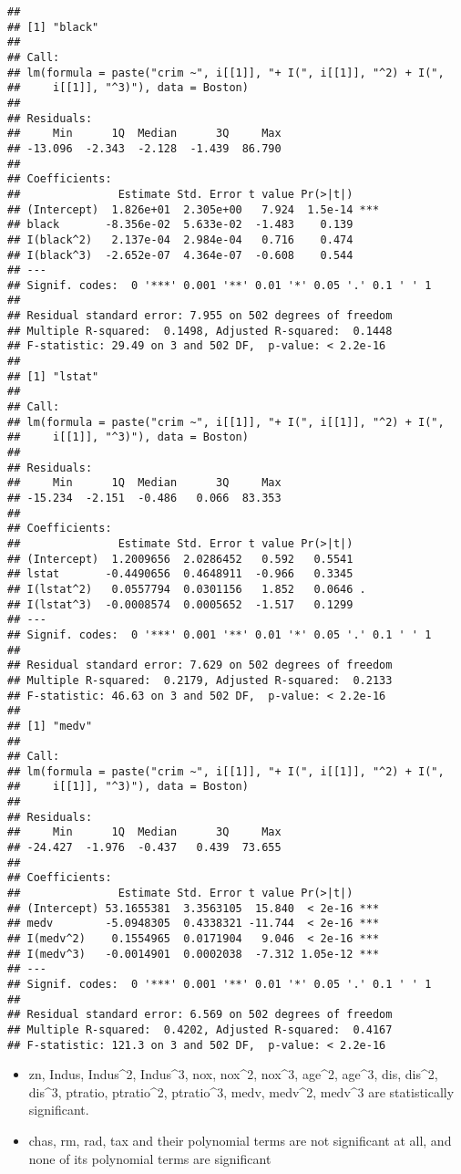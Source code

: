 \documentclass[
]{article}
\begin{document}
\begin{verbatim}
## 
## [1] "black"
## 
## Call:
## lm(formula = paste("crim ~", i[[1]], "+ I(", i[[1]], "^2) + I(", 
##     i[[1]], "^3)"), data = Boston)
## 
## Residuals:
##     Min      1Q  Median      3Q     Max 
## -13.096  -2.343  -2.128  -1.439  86.790 
## 
## Coefficients:
##               Estimate Std. Error t value Pr(>|t|)    
## (Intercept)  1.826e+01  2.305e+00   7.924  1.5e-14 ***
## black       -8.356e-02  5.633e-02  -1.483    0.139    
## I(black^2)   2.137e-04  2.984e-04   0.716    0.474    
## I(black^3)  -2.652e-07  4.364e-07  -0.608    0.544    
## ---
## Signif. codes:  0 '***' 0.001 '**' 0.01 '*' 0.05 '.' 0.1 ' ' 1
## 
## Residual standard error: 7.955 on 502 degrees of freedom
## Multiple R-squared:  0.1498, Adjusted R-squared:  0.1448 
## F-statistic: 29.49 on 3 and 502 DF,  p-value: < 2.2e-16
## 
## [1] "lstat"
## 
## Call:
## lm(formula = paste("crim ~", i[[1]], "+ I(", i[[1]], "^2) + I(", 
##     i[[1]], "^3)"), data = Boston)
## 
## Residuals:
##     Min      1Q  Median      3Q     Max 
## -15.234  -2.151  -0.486   0.066  83.353 
## 
## Coefficients:
##               Estimate Std. Error t value Pr(>|t|)  
## (Intercept)  1.2009656  2.0286452   0.592   0.5541  
## lstat       -0.4490656  0.4648911  -0.966   0.3345  
## I(lstat^2)   0.0557794  0.0301156   1.852   0.0646 .
## I(lstat^3)  -0.0008574  0.0005652  -1.517   0.1299  
## ---
## Signif. codes:  0 '***' 0.001 '**' 0.01 '*' 0.05 '.' 0.1 ' ' 1
## 
## Residual standard error: 7.629 on 502 degrees of freedom
## Multiple R-squared:  0.2179, Adjusted R-squared:  0.2133 
## F-statistic: 46.63 on 3 and 502 DF,  p-value: < 2.2e-16
## 
## [1] "medv"
## 
## Call:
## lm(formula = paste("crim ~", i[[1]], "+ I(", i[[1]], "^2) + I(", 
##     i[[1]], "^3)"), data = Boston)
## 
## Residuals:
##     Min      1Q  Median      3Q     Max 
## -24.427  -1.976  -0.437   0.439  73.655 
## 
## Coefficients:
##               Estimate Std. Error t value Pr(>|t|)    
## (Intercept) 53.1655381  3.3563105  15.840  < 2e-16 ***
## medv        -5.0948305  0.4338321 -11.744  < 2e-16 ***
## I(medv^2)    0.1554965  0.0171904   9.046  < 2e-16 ***
## I(medv^3)   -0.0014901  0.0002038  -7.312 1.05e-12 ***
## ---
## Signif. codes:  0 '***' 0.001 '**' 0.01 '*' 0.05 '.' 0.1 ' ' 1
## 
## Residual standard error: 6.569 on 502 degrees of freedom
## Multiple R-squared:  0.4202, Adjusted R-squared:  0.4167 
## F-statistic: 121.3 on 3 and 502 DF,  p-value: < 2.2e-16
\end{verbatim}

\begin{itemize}
\item
  zn, Indus, Indus\^{}2, Indus\^{}3, nox, nox\^{}2, nox\^{}3, age\^{}2,
  age\^{}3, dis, dis\^{}2, dis\^{}3, ptratio, ptratio\^{}2,
  ptratio\^{}3, medv, medv\^{}2, medv\^{}3 are statistically
  significant.
\item
  chas, rm, rad, tax and their polynomial terms are not significant at
  all, and none of its polynomial terms are significant
\end{itemize}
\end{document}
